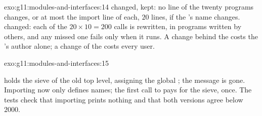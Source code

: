 \begin{solution}{exo:g11:modules-and-interfaces:14}
 changed,  kept: no line of the twenty programs changes, or at most the import line of each,
$20$ lines, if the 's name changes.  changed: each of the $20 \times 10 = 200$ calls is rewritten, in
programs written by others, and any missed one fails only when it runs. A change behind the  costs the
's author alone; a change of the  costs every user.
\end{solution}

\begin{solution}{exo:g11:modules-and-interfaces:15}
\smallskip\noindent\hspace*{2em}

\noindent\hspace*{2em}

\smallskip\noindent\hspace*{2em}

\noindent\hspace*{4em}

\noindent\hspace*{6em}

\noindent\hspace*{4em}

\smallskip\noindent {} holds the sieve of the old top level, assigning the global ; the message
is gone. Importing now only defines names; the first call to  pays for the sieve, once. The tests check
that importing prints nothing and that both versions agree below $2000$.
\end{solution}


